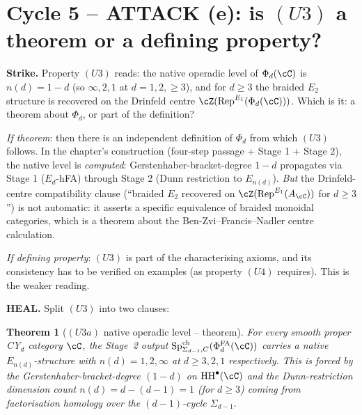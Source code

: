 \documentclass[11pt]{article}
\newtheorem{theorem}{Theorem}
\theoremstyle{definition}
\providecommand{\PhiFA}{\Phi^{\mathrm{FA}}}
\providecommand{\SpCh}{\mathrm{Sp}^{\mathrm{ch}}}
\providecommand{\HH}{\mathrm{HH}}
\providecommand{\Rep}{\mathrm{Rep}}
\begin{document}
\section*{Cycle 5 -- ATTACK (e): is $(U3)$ a theorem or a defining property?}

\noindent\textbf{Strike.} Property $(U3)$ reads: the native operadic
level of $\Phi_d(\cC)$ is $n(d) = 1 - d$ (so $\infty, 2, 1$ at
$d = 1, 2, {\geq}3$), and for $d \geq 3$ the braided $E_2$ structure
is recovered on the Drinfeld centre $\cZ(\Rep^{E_1}(\Phi_d(\cC)))$.
Which is it: a theorem about $\Phi_d$, or part of the definition?

\smallskip
\emph{If theorem}: then there is an independent definition of $\Phi_d$
from which $(U3)$ follows. In the chapter's construction
(four-step passage + Stage 1 + Stage 2), the native level is
\emph{computed}: Gerstenhaber-bracket-degree $1 - d$ propagates via
Stage 1 ($E_d$-hFA) through Stage 2 (Dunn restriction to $E_{n(d)}$).
\emph{But} the Drinfeld-centre compatibility clause (``braided $E_2$
recovered on $\cZ(\Rep^{E_1}(A_\cC))$ for $d \geq 3$'') is not
automatic: it asserts a specific equivalence of braided monoidal
categories, which is a theorem about the
Ben-Zvi--Francis--Nadler centre calculation.

\emph{If defining property}: $(U3)$ is part of the characterising
axioms, and its consistency has to be verified on examples (as
property $(U4)$ requires). This is the weaker reading.

\smallskip
\noindent\textbf{HEAL.}  Split $(U3)$ into two clauses:

\begin{theorem}[$(U3a)$ native operadic level -- theorem]
\label{thm:u3a-native-level}
For every smooth proper CY$_d$ category $\cC$, the Stage~2 output
$\SpCh_{\Sigma_{d-1}, C}(\PhiFA_d(\cC))$ carries a native
$E_{n(d)}$-structure with $n(d) = 1, 2, \infty$ at $d \geq 3, 2, 1$
respectively. This is forced by the Gerstenhaber-bracket-degree
$(1 - d)$ on $\HH^\bullet(\cC)$ and the Dunn-restriction dimension
count $n(d) = d - (d - 1) = 1$ (for $d \geq 3$) coming from
factorisation homology over the $(d-1)$-cycle $\Sigma_{d-1}$.
\end{theorem}
\end{document}
